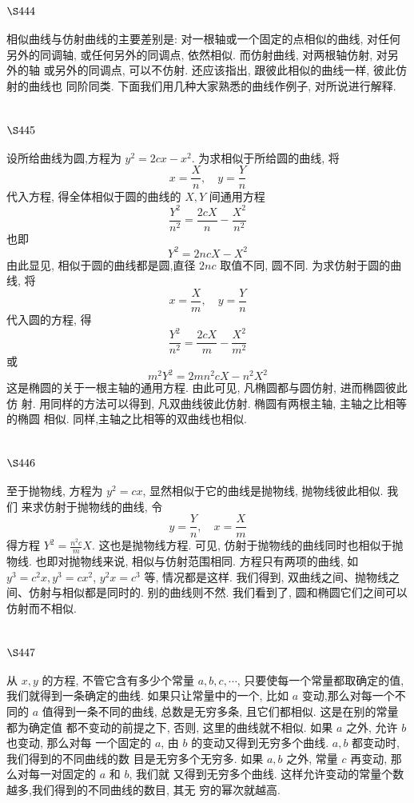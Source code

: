\section{$\S 444$}

相似曲线与仿射曲线的主要差别是: 对一根轴或一个固定的点相似的曲线, 对任何 另外的同调轴, 或任何另外的同调点, 依然相似. 而仿射曲线, 对两根轴仿射, 对另外的轴 或另外的同调点, 可以不仿射. 还应该指出, 跟彼此相似的曲线一样, 彼此仿射的曲线也 同阶同类. 下面我们用几种大家熟悉的曲线作例子, 对所说进行解释.

\section{$\S 445$}

设所给曲线为圆,方程为 $y^{2}=2 c x-x^{2}$. 为求相似于所给圆的曲线, 将
\[
x=\frac{X}{n}, \quad y=\frac{Y}{n}
\]
代入方程, 得全体相似于圆的曲线的 $X, Y$ 间通用方程
\[
\frac{Y^{2}}{n^{2}}=\frac{2 c X}{n}-\frac{X^{2}}{n^{2}}
\]
也即
\[
Y^{2}=2 n c X-X^{2}
\]
由此显见, 相似于圆的曲线都是圆,直径 $2 n c$ 取值不同, 圆不同. 为求仿射于圆的曲线, 将
\[
x=\frac{X}{m}, \quad y=\frac{Y}{n}
\]
代入圆的方程, 得
\[
\frac{Y^{2}}{n^{2}}=\frac{2 c X}{m}-\frac{X^{2}}{m^{2}}
\]
或 
\[
m^{2} Y^{2}=2 m n^{2} c X-n^{2} X^{2}
\]
这是椭圆的关于一根主轴的通用方程. 由此可见, 凡椭圆都与圆仿射, 进而椭圆彼此仿 射. 用同样的方法可以得到, 凡双曲线彼此仿射. 椭圆有两根主轴, 主轴之比相等的椭圆 相似. 同样,主轴之比相等的双曲线也相似.

\section{$\S 446$}

至于抛物线, 方程为 $y^{2}=c x$, 显然相似于它的曲线是抛物线, 抛物线彼此相似. 我们 来求仿射于抛物线的曲线, 令
\[
y=\frac{Y}{n}, \quad x=\frac{X}{m}
\]
得方程 $Y^{2}=\frac{n^{2} c}{m} X$. 这也是抛物线方程. 可见, 仿射于抛物线的曲线同时也相似于抛物线. 也即对抛物线来说, 相似与仿射范围相同. 方程只有两项的曲线, 如 $y^{3}=c^{2} x, y^{3}=c x^{2}$, $y^{2} x=c^{3}$ 等, 情况都是这样. 我们得到, 双曲线之间、抛物线之间、仿射与相似都是同时的. 别的曲线则不然. 我们看到了, 圆和椭圆它们之间可以仿射而不相似.

\section{$\S 447$}

从 $x, y$ 的方程, 不管它含有多少个常量 $a, b, c, \cdots$, 只要使每一个常量都取确定的值, 我们就得到一条确定的曲线. 如果只让常量中的一个, 比如 $a$ 变动,那么对每一个不同的 $a$ 值得到一条不同的曲线, 总数是无穷多条, 且它们都相似. 这是在别的常量都为确定值 都不变动的前提之下, 否则, 这里的曲线就不相似. 如果 $a$ 之外, 允许 $b$ 也变动, 那么对每 一个固定的 $a$, 由 $b$ 的变动又得到无穷多个曲线. $a, b$ 都变动时, 我们得到的不同曲线的数 目是无穷多个无穷多. 如果 $a, b$ 之外, 常量 $c$ 再变动, 那么对每一对固定的 $a$ 和 $b$, 我们就 又得到无穷多个曲线. 这样允许变动的常量个数越多,我们得到的不同曲线的数目, 其无 穷的幂次就越高.

